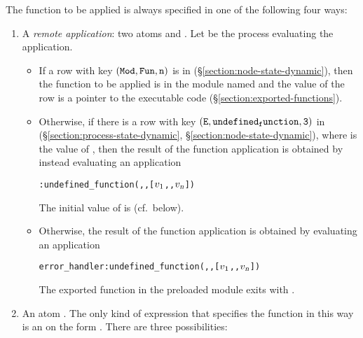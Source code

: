 The function to be applied is always specified in one of the following four
ways:
\begin{enumerate}

\item \label{item:explicit-mod-fun}
A \emph{remote application}: two atoms  and .
Let  be the process evaluating the application.
\begin{itemize}

\item If a row with key $({\tt{\sl Mod}},{\tt{\sl Fun}},{\tt{\sl n}})$ is in
 (\S\ref{section:node-state-dynamic}),
then the function to be applied is  in
the module named  and the value of the row is a pointer to the executable code
(\S\ref{section:exported-functions}).

\item {}
Otherwise, if there is a row with key
$({\tt{\sl E}},{\tt undefined_function},{\tt3})$ in
 (\S\ref{section:process-state-dynamic},
\S\ref{section:node-state-dynamic}), where  is the value of ,
then the result of the function application is obtained by instead
evaluating an application
\begin{alltt}
:undefined_function(,,[\(\Z{v}\sb{1}\),\tdots,\(\Z{v}\sb{\TZm{n}}\)])
\end{alltt}
The initial value of  is  (cf.~below).

\item Otherwise, the result of the
function application is obtained by evaluating an application
\begin{alltt}
error_handler:undefined_function(,,[\(\Z{v}\sb{1}\),\tdots,\(\Z{v}\sb{\TZm{n}}\)])
\end{alltt}
The exported function  in the
preloaded module 
exits with
.

\end{itemize}

\item \label{item:function-application-atom}
An atom .
The only kind of expression that specifies the
function in this way is an  on the form
 \TXT{(}  \TXT{)}.
There are three possibilities:
\begin{itemize}


\end{itemize}
\end{enumerate}
